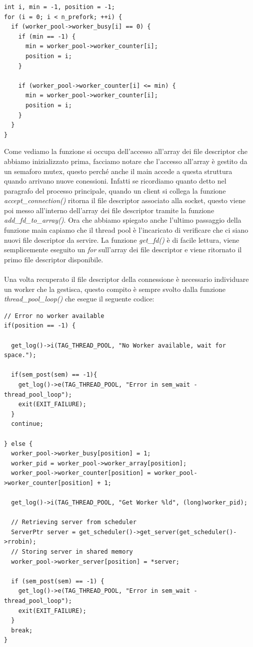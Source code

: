 \documentclass[italian]{tktltiki2}
\begin{document}
\begin{lstlisting}
int i, min = -1, position = -1;
for (i = 0; i < n_prefork; ++i) {
  if (worker_pool->worker_busy[i] == 0) {
    if (min == -1) {
      min = worker_pool->worker_counter[i];
      position = i;
    }

    if (worker_pool->worker_counter[i] <= min) {
      min = worker_pool->worker_counter[i];
      position = i;
    }
  }
}
\end{lstlisting}
Come vediamo la funzione si occupa dell'accesso all'array dei file descriptor che abbiamo inizializzato prima, facciamo notare che l'accesso all'array è gestito da un semaforo mutex, questo perché anche il main accede a questa struttura quando arrivano nuove conessioni. Infatti se ricordiamo quanto detto nel paragrafo del processo principale, quando un client si collega la funzione \emph{accept\_connection()} ritorna il file descriptor associato alla socket, questo viene poi messo all'interno dell'array dei file descriptor tramite la funzione \emph{add\_fd\_to\_array()}. Ora che abbiamo spiegato anche l'ultimo passaggio della funzione main capiamo che il thread pool è l'incaricato di verificare che ci siano nuovi file descriptor da servire. La funzione \emph{get\_fd()} è di facile lettura, viene semplicemente eseguito un \emph{for} sull'array dei file descriptor e viene ritornato il primo file descriptor disponibile.\\\\ Una volta recuperato il file descriptor della connessione è necessario individuare un worker che la gestisca, questo compito è sempre svolto dalla funzione \emph{thread\_pool\_loop()} che esegue il seguente codice:
\begin{lstlisting}
// Error no worker available
if(position == -1) {
  
  get_log()->i(TAG_THREAD_POOL, "No Worker available, wait for space.");

  if(sem_post(sem) == -1){
    get_log()->e(TAG_THREAD_POOL, "Error in sem_wait - thread_pool_loop");
    exit(EXIT_FAILURE);
  }
  continue;

} else {
  worker_pool->worker_busy[position] = 1;
  worker_pid = worker_pool->worker_array[position];
  worker_pool->worker_counter[position] = worker_pool->worker_counter[position] + 1;
  
  get_log()->i(TAG_THREAD_POOL, "Get Worker %ld", (long)worker_pid);

  // Retrieving server from scheduler
  ServerPtr server = get_scheduler()->get_server(get_scheduler()->rrobin);
  // Storing server in shared memory
  worker_pool->worker_server[position] = *server;
  
  if (sem_post(sem) == -1) {
    get_log()->e(TAG_THREAD_POOL, "Error in sem_wait - thread_pool_loop");
    exit(EXIT_FAILURE);
  }
  break;
}
\end{lstlisting}
\end{document}
